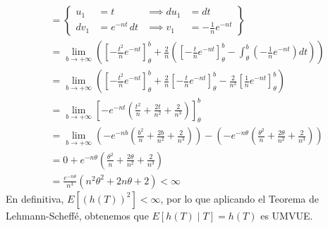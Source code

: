 \begin{ejercicio}
\begin{align*}
&= \left\{
\begin{aligned}
u_1 &= t &\implies du_1 &= dt \\
dv_1 &= e^{-nt} \, dt &\implies v_1 &= -\frac{1}{n} e^{-nt}
\end{aligned}
\right\} \\
&= \lim_{b \to +\infty} \left( \left[ -\frac{t^2}{n} e^{-nt} \right]_{\theta}^{b} + \frac{2}{n} \left( \left[ -\frac{t}{n} e^{-nt} \right]_{\theta}^{b} - \int_{\theta}^{b} \left( -\frac{1}{n} e^{-nt} \right) dt \right) \right) \\
&= \lim_{b \to +\infty} \left( \left[ -\frac{t^2}{n} e^{-nt} \right]_{\theta}^{b} + \frac{2}{n} \left[ -\frac{t}{n} e^{-nt} \right]_{\theta}^{b} - \frac{2}{n^2} \left[ \frac{1}{n} e^{-nt} \right]_{\theta}^{b} \right) \\
&= \lim_{b \to +\infty} \left[ -e^{-nt} \left( \frac{t^2}{n} + \frac{2t}{n^2} + \frac{2}{n^3} \right) \right]_{\theta}^{b} \\
&= \lim_{b \to +\infty} \left( -e^{-nb} \left( \frac{b^2}{n} + \frac{2b}{n^2} + \frac{2}{n^3} \right) \right) - \left( -e^{-n\theta} \left( \frac{\theta^2}{n} + \frac{2\theta}{n^2} + \frac{2}{n^3} \right) \right) \\
&= 0 + e^{-n\theta} \left( \frac{\theta^2}{n} + \frac{2\theta}{n^2} + \frac{2}{n^3} \right)\\
&= \frac{e^{-n\theta}}{n^3} \left( n^2\theta^2 + 2n\theta + 2 \right) < \infty
\end{align*}
    En definitiva, $E[{(h(T))}^{2}] < \infty$, por lo que aplicando el Teorema de Lehmann-Scheffé, obtenemos que $E[h(T)\mid T] = h(T)$ es UMVUE.\\ 



\end{ejercicio}
